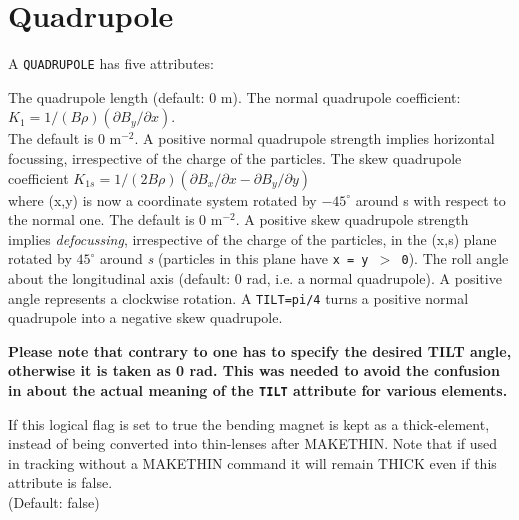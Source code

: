 \section{Quadrupole}
\label{sec:quadrupole}



A \texttt{QUADRUPOLE} has five attributes:
\begin{madlist}
    The quadrupole length (default: 0 m).
    The normal quadrupole coefficient:
     $K_1 = 1/(B \rho) (\partial B_y / \partial x)$.\\
     The default is 0 m$^{-2}$. A positive normal quadrupole strength
     implies horizontal focussing, irrespective of the charge of the particles.
    The skew quadrupole coefficient
     $K_{1s} = 1/(2 B \rho) (\partial B_x / \partial x - \partial B_y / \partial y)$\\
     where (x,y) is now a coordinate system rotated by $-45^\circ$ around s
     with respect to the normal one. The default is 0 m$^{-2}$. A
     positive skew quadrupole strength implies \textsl{defocussing},
     irrespective of the charge of the particles,
     in the (x,s) plane rotated by $45^\circ$
     around \textit{s} (particles in this plane have \texttt{x = y $>$ 0}).
    The roll angle about the longitudinal axis (default: 0
     rad, i.e. a normal quadrupole). A positive angle represents a
     clockwise rotation. A \texttt{TILT=pi/4} turns a positive normal quadrupole
     into a negative skew quadrupole.

   \textbf{Please note that contrary to \madeight one has to
     specify the desired TILT angle, otherwise it is taken as
     0 rad. This was needed to avoid the confusion in \madeight
     about the actual meaning of the \texttt{TILT} attribute for
     various elements.}

     If this logical flag is set to true the bending
   magnet is kept as a thick-element, instead of being
   converted into thin-lenses after MAKETHIN. Note that
   if used in tracking without a MAKETHIN command it will
   remain THICK even if this attribute is false. \\
   (Default: false)
\end{madlist}

